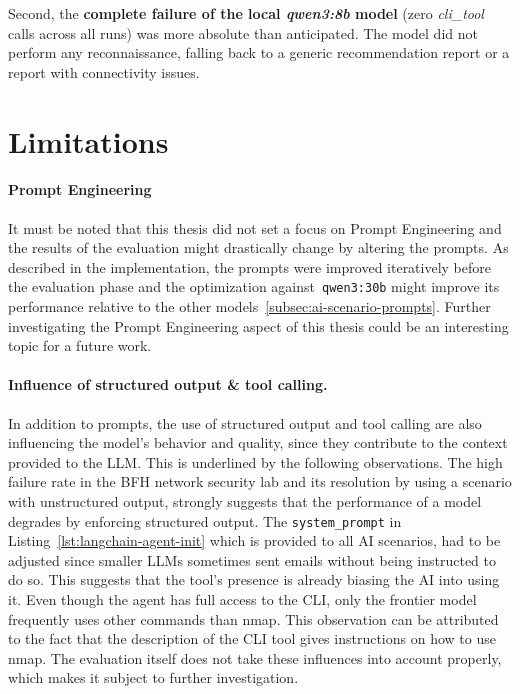 Second, the \textbf{complete failure of the local \textit{qwen3:8b} model} (zero
\textit{cli\_tool} calls across all runs) was more absolute than anticipated.
The model did not perform any reconnaissance, falling back to a generic recommendation report or a report with connectivity issues.


\section{Limitations}\label{sec:discussion-limitations}

\paragraph{Prompt Engineering}
It must be noted that this thesis did not set a focus on Prompt Engineering
and the results of the evaluation might drastically change by altering the prompts.
As described in the implementation, the prompts were improved iteratively before the evaluation phase
and the optimization against~\texttt{qwen3:30b} might improve its performance relative to the other models~\ref{subsec:ai-scenario-prompts}.
Further investigating the Prompt Engineering aspect of this thesis could be an interesting topic for a future work.

\paragraph{Influence of structured output \& tool calling.}
In addition to prompts,
the use of structured output and tool calling are also influencing the model's behavior and quality,
since they contribute to the context provided to the \gls{LLM}.
This is underlined by the following observations.
The high failure rate in the BFH network security lab
and its resolution by using a scenario with unstructured output,
strongly suggests that the performance of a model degrades by enforcing structured output.
The \texttt{system_prompt} in Listing~\ref{lst:langchain-agent-init} which is provided to all \gls{AI} scenarios,
had to be adjusted since smaller \glspl{LLM} sometimes sent emails without being instructed to do so.
This suggests that the tool's presence is already biasing the \gls{AI} into using it.
Even though the agent has full access to the \gls{CLI},
only the frontier model frequently uses other commands than nmap.
This observation can be attributed to the fact that the description of the \gls{CLI} tool gives instructions on how to use nmap.
The evaluation itself does not take these influences into account properly,
which makes it subject to further investigation.

